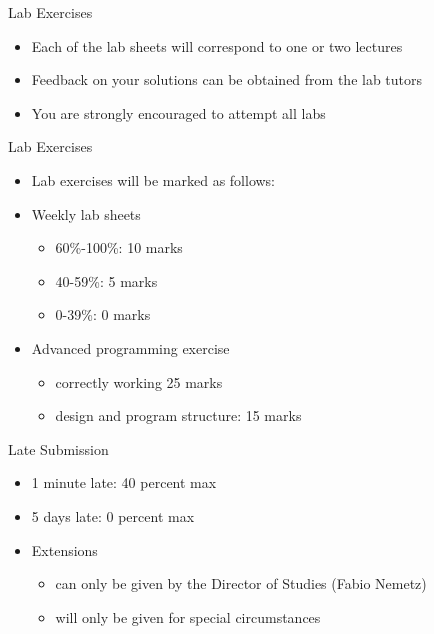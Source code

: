 \documentclass{beamer}
\begin{document}
\begin{frame}
Lab Exercises

\begin{itemize}
\item Each of the lab sheets will correspond to one or two lectures
\item Feedback on your solutions can be obtained from the lab tutors
\item You are strongly encouraged to attempt all labs
\end{itemize}
\end{frame} \begin{frame}

Lab Exercises

\begin{itemize}
\item Lab exercises will be marked as follows:
\item Weekly lab sheets

\begin{itemize}
\item 60\%-100\%: 10 marks
\item 40-59\%: 5 marks
\item 0-39\%: 0 marks
\end{itemize}
\item Advanced programming exercise

\begin{itemize}
\item correctly working 25 marks
\item design and program structure: 15 marks
\end{itemize}
\end{itemize}
\end{frame} 

\begin{frame}
Late Submission

\begin{itemize}
\item 1 minute late: 40 percent max
\item 5 days late: 0 percent max
\item Extensions 

\begin{itemize}
\item can only be given by the Director of Studies (Fabio Nemetz)
\item will only be given for special circumstances 
\end{itemize}
\end{itemize}
\end{frame}
\end{document}
